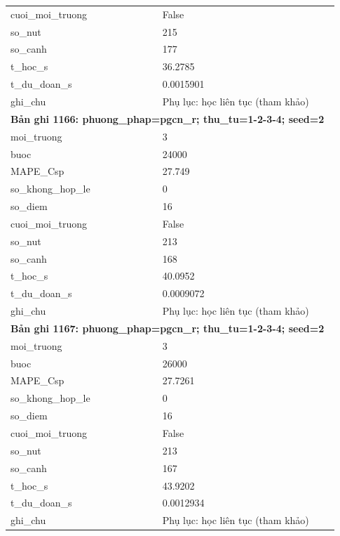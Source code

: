 \begin{longtable}{p{0.43\linewidth}p{0.50\linewidth}}
cuoi\_\allowbreak moi\_\allowbreak truong & False \\
so\_\allowbreak nut & 215 \\
so\_\allowbreak canh & 177 \\
t\_\allowbreak hoc\_\allowbreak s & 36.2785 \\
t\_\allowbreak du\_\allowbreak doan\_\allowbreak s & 0.0015901 \\
ghi\_\allowbreak chu & Phụ lục: học liên tục (tham khảo) \\
\midrule
\multicolumn{2}{p{0.95\linewidth}}{\textbf{Bản ghi 1166: phuong\_phap=pgcn\_r; thu\_tu=1-2-3-4; seed=2}} \\
moi\_\allowbreak truong & 3 \\
buoc & 24000 \\
MAPE\_\allowbreak Csp & 27.749 \\
so\_\allowbreak khong\_\allowbreak hop\_\allowbreak le & 0 \\
so\_\allowbreak diem & 16 \\
cuoi\_\allowbreak moi\_\allowbreak truong & False \\
so\_\allowbreak nut & 213 \\
so\_\allowbreak canh & 168 \\
t\_\allowbreak hoc\_\allowbreak s & 40.0952 \\
t\_\allowbreak du\_\allowbreak doan\_\allowbreak s & 0.0009072 \\
ghi\_\allowbreak chu & Phụ lục: học liên tục (tham khảo) \\
\midrule
\multicolumn{2}{p{0.95\linewidth}}{\textbf{Bản ghi 1167: phuong\_phap=pgcn\_r; thu\_tu=1-2-3-4; seed=2}} \\
moi\_\allowbreak truong & 3 \\
buoc & 26000 \\
MAPE\_\allowbreak Csp & 27.7261 \\
so\_\allowbreak khong\_\allowbreak hop\_\allowbreak le & 0 \\
so\_\allowbreak diem & 16 \\
cuoi\_\allowbreak moi\_\allowbreak truong & False \\
so\_\allowbreak nut & 213 \\
so\_\allowbreak canh & 167 \\
t\_\allowbreak hoc\_\allowbreak s & 43.9202 \\
t\_\allowbreak du\_\allowbreak doan\_\allowbreak s & 0.0012934 \\
ghi\_\allowbreak chu & Phụ lục: học liên tục (tham khảo) \\

\end{longtable}

